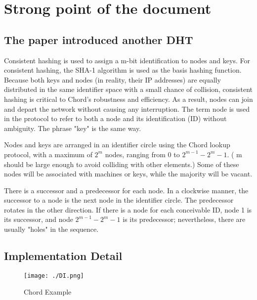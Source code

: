 \documentclass[acmlarge]{acmart}
\begin{document}
\maketitle
\section{Strong point of the document}

\subsection{The paper introduced another DHT}
Consistent hashing is used to assign a m-bit identification to nodes and keys. For consistent hashing, the SHA-1 algorithm is used as the basis hashing function. Because both keys and nodes (in reality, their IP addresses) are equally distributed in the same identifier space with a small chance of collision, consistent hashing is critical to Chord's robustness and efficiency. As a result, nodes can join and depart the network without causing any interruption. The term node is used in the protocol to refer to both a node and its identification (ID) without ambiguity. The phrase "key" is the same way.

Nodes and keys are arranged in an identifier circle using the Chord lookup protocol, with a maximum of $2^m$ nodes, ranging from 0 to $2^{m-1}-2^m - 1$. ( m should be large enough to avoid colliding with other elements.) Some of these nodes will be associated with machines or keys, while the majority will be vacant.

There is a successor and a predecessor for each node. In a clockwise manner, the successor to a node is the next node in the identifier circle. The predecessor rotates in the other direction. If there is a node for each conceivable ID, node 1 is its successor, and node $2^{m-1}-2^m - 1$ is its predecessor; nevertheless, there are usually "holes" in the sequence.
\subsection{Implementation Detail}

\begin{figure}[htbp]
  \centering
  \texttt{[image: ./DI.png]}
  \caption{Chord Example}
\end{figure}
\end{document}
